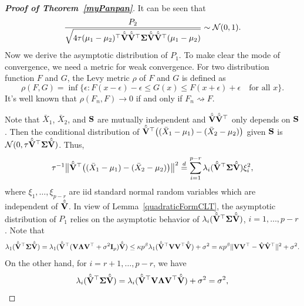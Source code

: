 \documentclass[times,sort&compress,3p]{elsarticle}
\theoremstyle{plain}
\theoremstyle{definition}
\theoremstyle{remark}
\begin{document}
\begin{appendices}
\begin{proof}[\textbf{Proof of Theorem~\ref{myPanpan}}]
   It can be seen that
   $$
   \frac{P_2}{\sqrt{4\tau (\mu_1-\mu_2)^\top  \hat{\tilde{\mathbf{V}}}\hat{\tilde{\mathbf{V}}}^\top  \boldsymbol{\Sigma}\hat{\tilde{\mathbf{V}}}\hat{\tilde{\mathbf{V}}}^\top  (\mu_1-\mu_2)}} \sim \mathcal{N}(0,1).
   $$
    Now we derive the asymptotic distribution of $P_1$.
    To make clear the mode of convergence, we need a metric for weak convergence. For two distribution function $F$ and $G$, the Levy metric $\rho$ of $F$ and $G$ is defined as
    $$
   \rho(F,G) =\inf\{\epsilon:F(x-\epsilon)-\epsilon\leq G(x)\leq F(x+\epsilon)+\epsilon\quad \textrm{for all $x$}\}.
    $$
    It's well known that $\rho(F_n,F)\to 0$ if and only if $F_n\rightsquigarrow F$.


    Note that $\bar{X}_1$, $\bar{X}_2$, and $\mathbf{S}$ are mutually independent and $\hat{\tilde{\mathbf{V}}}\hat{\tilde{\mathbf{V}}}^\top $ only depends on $\mathbf{S}$.
    Then the conditional distribution of
    $\hat{\tilde{\mathbf{V}}}^\top \big((\bar{X}_1-\mu_1)-(\bar{X}_2-\mu_2)\big)$ given $\mathbf{S}$ is $\mathcal{N}(0,\tau \hat{\tilde{\mathbf{V}}}^\top \boldsymbol{\Sigma}\hat{\tilde{\mathbf{V}}})$.
    Thus,
\begin{equation}\label{houjia2}
\tau^{-1}\big\|\hat{\tilde{\mathbf{V}}}^\top \big((\bar{X}_1-\mu_1)-(\bar{X}_2-\mu_2)\big)\big\|^2
    \overset{d}{=}
    \sum_{i=1}^{p-r} \lambda_i(\hat{\tilde{\mathbf{V}}}^\top \boldsymbol{\Sigma}\hat{\tilde{\mathbf{V}}})\xi_i^2,
\end{equation}
where $\xi_1,\ldots,\xi_{p-r}$ are iid  standard normal random variables which are independent of $\hat{\tilde{\mathbf{V}}}$.
    In view of Lemma~\ref{quadraticFormCLT}, the asymptotic distribution of $P_1$ relies on the asymptotic behavior of $\lambda_i(\hat{\tilde{\mathbf{V}}}^\top \boldsymbol{\Sigma}\hat{\tilde{\mathbf{V}}})$, $i=1,\ldots, p-r$.
     Note that
     \begin{equation}\label{houjia1}
     \lambda_1(\hat{\tilde{\mathbf{V}}}^\top \boldsymbol{\Sigma}\hat{\tilde{\mathbf{V}}})
             =
             \lambda_1(\hat{\tilde{\mathbf{V}}}^\top  (\mathbf{V}\boldsymbol{\Lambda} \mathbf{V}^\top  +\sigma^2 \mathbf{I}_p) \hat{\tilde{\mathbf{V}}})
         \leq 
     \kappa p^{\beta}\lambda_1(\hat{\tilde{\mathbf{V}}}^\top  \mathbf{V} \mathbf{V}^\top \hat{\tilde{\mathbf{V}}})+\sigma^2
     =
    \kappa p^\beta \|\mathbf{V}\mathbf{V}^\top  -\hat{\mathbf{V}}\hat{\mathbf{V}}^\top \|^2+\sigma^2.
     \end{equation}
    On the other hand,
    for $i=r+1,\ldots,p-r$,
    we have
    \begin{equation}\label{houjia3}
    \lambda_i(\hat{\tilde{\mathbf{V}}}^\top \boldsymbol{\Sigma}\hat{\tilde{\mathbf{V}}})
    =
    \lambda_i(\hat{\tilde{\mathbf{V}}}^\top  \mathbf{V} \boldsymbol{\Lambda} \mathbf{V}^\top  \hat{\tilde{\mathbf{V}}})+\sigma^2
    =\sigma^2,
    \end{equation}

\end{proof}
\end{appendices}
\end{document}
